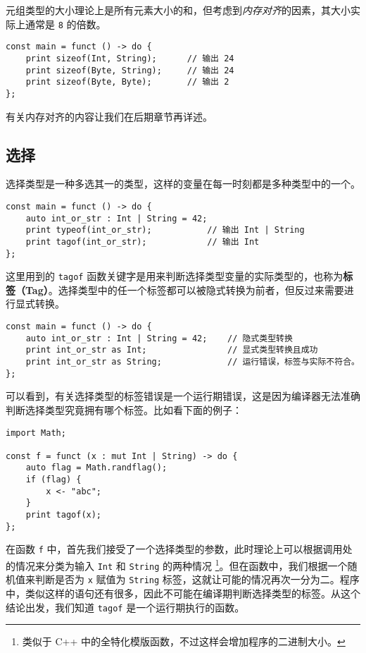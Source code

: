 元组类型的大小理论上是所有元素大小的和，但考虑到\emph{内存对齐}的因素，其大小实际上通常是 \lstinline!8! 的倍数。

\begin{lstlisting}
const main = funct () -> do {
    print sizeof(Int, String);      // 输出 24
    print sizeof(Byte, String);     // 输出 24
    print sizeof(Byte, Byte);       // 输出 2
};
\end{lstlisting}

有关内存对齐的内容让我们在后期章节再详述。

\subsection{选择}

选择类型是一种多选其一的类型，这样的变量在每一时刻都是多种类型中的一个。

\begin{minipage}[c]{0.95\textwidth}
\vspace{1.0em}
\begin{lstlisting}
const main = funct () -> do {
    auto int_or_str : Int | String = 42;
    print typeof(int_or_str);           // 输出 Int | String
    print tagof(int_or_str);            // 输出 Int
};
\end{lstlisting}
\end{minipage}


这里用到的 \lstinline!tagof! 函数关键字是用来判断选择类型变量的实际类型的，也称为\textbf{标签（Tag）}。选择类型中的任一个标签都可以被隐式转换为前者，但反过来需要进行显式转换。

\begin{lstlisting}
const main = funct () -> do {
    auto int_or_str : Int | String = 42;    // 隐式类型转换
    print int_or_str as Int;                // 显式类型转换且成功
    print int_or_str as String;             // 运行错误，标签与实际不符合。
};
\end{lstlisting}

可以看到，有关选择类型的标签错误是一个运行期错误，这是因为编译器无法准确判断选择类型究竟拥有哪个标签。比如看下面的例子：

\begin{lstlisting}
import Math;

const f = funct (x : mut Int | String) -> do {
    auto flag = Math.randflag();
    if (flag) {
        x <- "abc";
    }
    print tagof(x);
};
\end{lstlisting}

在函数 \lstinline!f! 中，首先我们接受了一个选择类型的参数，此时理论上可以根据调用处的情况来分类为输入 \lstinline!Int! 和 \lstinline!String! 的两种情况 \footnote{类似于 C++ 中的全特化模版函数，不过这样会增加程序的二进制大小。}。但在函数中，我们根据一个随机值来判断是否为 \lstinline!x! 赋值为 \lstinline!String! 标签，这就让可能的情况再次一分为二。程序中，类似这样的语句还有很多，因此不可能在编译期判断选择类型的标签。从这个结论出发，我们知道 \lstinline!tagof! 是一个运行期执行的函数。 \\

